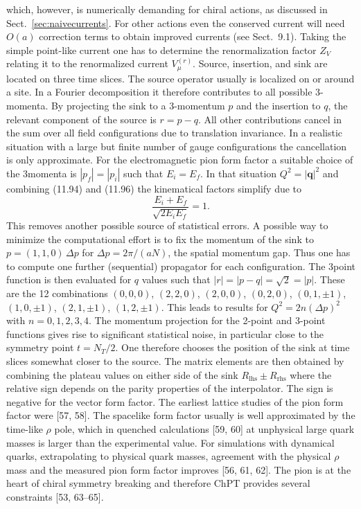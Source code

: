 which, however, is numerically demanding for chiral actions, as discussed in
Sect.~\ref{sec:naivecurrents}. For other actions even the conserved current will need $O(a)$
correction terms to obtain improved currents (see Sect.~9.1). Taking the simple
point-like current one has to determine the renormalization factor $Z_V$ relating
it to the renormalized current $V_\mu^{(r)}$.
Source, insertion, and sink are located on three time slices. The source
operator usually is localized on or around a site. In a Fourier decomposition
it therefore contributes to all possible 3-momenta. By projecting the sink to a
3-momentum $p$ and the insertion to $q$, the relevant component of the source is
$r = p - q$. All other contributions cancel in the sum over all field configurations
due to translation invariance. In a realistic situation with a large but finite
number of gauge configurations the cancellation is only approximate.
For the electromagnetic pion form factor a suitable choice of the 3momenta is $|p_f| = |p_i|$ such that $E_i = E_f$. In that situation $Q^2 = |\mathbf{q}|^2$
and combining (11.94) and (11.96) the kinematical factors simplify due to
\begin{equation}
\frac{E_i + E_f}{\sqrt{2E_iE_f}} = 1 .
\end{equation}
This removes another possible source of statistical errors. A possible way to
minimize the computational effort is to fix the momentum of the sink to
$p = (1, 1, 0)\,\Delta p$ for $\Delta p = 2\pi/(aN)$, the spatial momentum gap. Thus one has
to compute one further (sequential) propagator for each configuration. The 3point function is then evaluated for $q$ values such that $|r| = |p - q| = \sqrt{2} = |p|$.
These are the 12 combinations $(0, 0, 0)$, $(2, 2, 0)$, $(2, 0, 0)$, $(0, 2, 0)$, $(0, 1, \pm 1)$,
$(1, 0, \pm 1)$, $(2, 1, \pm 1)$, $(1, 2, \pm 1)$. This leads to results for $Q^2 = 2n(\Delta p)^2$ with
$n = 0, 1, 2, 3, 4$.
The momentum projection for the 2-point and 3-point functions gives rise
to significant statistical noise, in particular close to the symmetry point $t =
N_T/2$. One therefore chooses the position of the sink at time slices somewhat
closer to the source. The matrix elements are then obtained by combining the
plateau values on either side of the sink $R_{\mathrm{lhs}} \pm R_{\mathrm{rhs}}$ where the relative sign
depends on the parity properties of the interpolator. The sign is negative for
the vector form factor.
The earliest lattice studies of the pion form factor were [57, 58]. The spacelike form factor usually is well approximated by the time-like $\rho$ pole, which
in quenched calculations [59, 60] at unphysical large quark masses is larger
than the experimental value. For simulations with dynamical quarks, extrapolating to physical quark masses, agreement with the physical $\rho$ mass and
the measured pion form factor improves [56, 61, 62]. The pion is at the heart
of chiral symmetry breaking and therefore ChPT provides several constraints
[53, 63--65].

